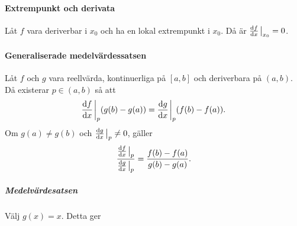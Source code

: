 \paragraph{Extrempunkt och derivata}
Låt $f$ vara deriverbar i $x_0$ och ha en lokal extrempunkt i $x_0$. Då är $\dv{f}{x}\eval_{x_0} = 0$.

\paragraph{Generaliserade medelvärdessatsen}
Låt $f$ och $g$ vara reellvärda, kontinuerliga på $[a, b]$ och deriverbara på $(a, b)$. Då existerar $p\in (a, b)$ så att
\begin{align*}
	\dv{f}{x}\eval_p(g(b) - g(a)) = \dv{g}{x}\eval_p(f(b) - f(a)).
\end{align*}
Om $g(a)\neq g(b)$ och $\dv{g}{x}\eval_p\neq 0$, gäller
\begin{align*}
	\frac{\dv{f}{x}\eval_p}{\dv{g}{x}\eval_p} = \frac{f(b) - f(a)}{g(b) - g(a)}.
\end{align*}

\subparagraph{Medelvärdesatsen}
Välj $g(x) = x$. Detta ger